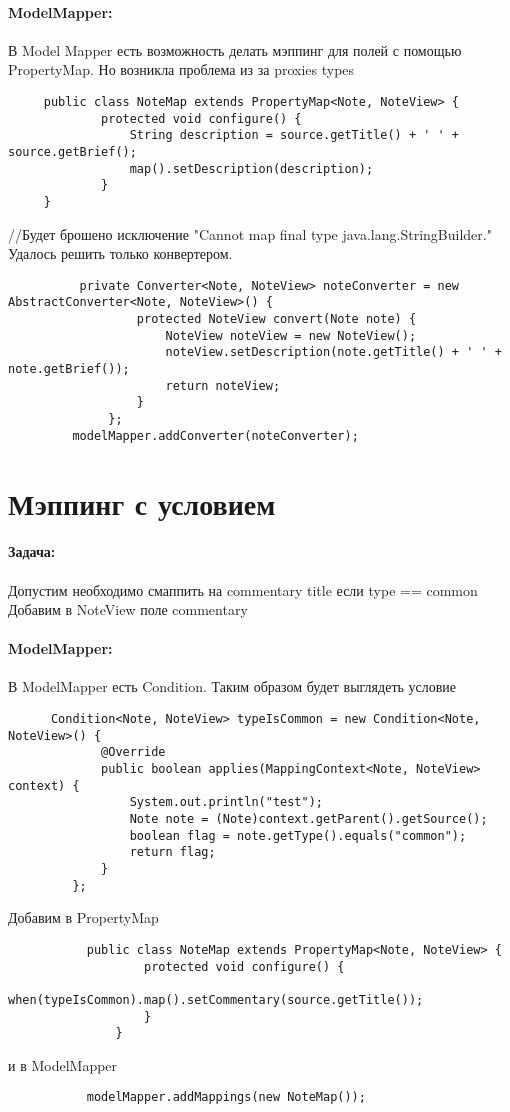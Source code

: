 \documentclass{article}
\begin{document}
    
     \paragraph{ModelMapper:}
     В Model Mapper есть возможность делать мэппинг для полей с помощью  PropertyMap.
     Но возникла проблема из за proxies types
     \begin{lstlisting} 
     public class NoteMap extends PropertyMap<Note, NoteView> {
             protected void configure() {
                 String description = source.getTitle() + ' ' + source.getBrief();
                 map().setDescription(description);
             }
     }
     \end{lstlisting}
     //Будет брошено исключение 
     "Cannot map final type java.lang.StringBuilder."
      Удалось решить только конвертером.
      \begin{lstlisting} 
          private Converter<Note, NoteView> noteConverter = new AbstractConverter<Note, NoteView>() {
                  protected NoteView convert(Note note) {
                      NoteView noteView = new NoteView();
                      noteView.setDescription(note.getTitle() + ' ' + note.getBrief());
                      return noteView;
                  }
              };
         modelMapper.addConverter(noteConverter);
     \end{lstlisting}
\section{Мэппинг с условием} 
    
    \paragraph{Задача:}
Допустим необходимо смаппить на commentary title если type == common 
Добавим в NoteView поле commentary

\paragraph{ModelMapper:}
В ModelMapper есть Condition.
Таким образом будет выглядеть условие
\begin{lstlisting} 
      Condition<Note, NoteView> typeIsCommon = new Condition<Note, NoteView>() {
             @Override
             public boolean applies(MappingContext<Note, NoteView> context) {
                 System.out.println("test");
                 Note note = (Note)context.getParent().getSource();
                 boolean flag = note.getType().equals("common");
                 return flag;
             }
         };
\end{lstlisting}
Добавим в PropertyMap     
     \begin{lstlisting} 
           public class NoteMap extends PropertyMap<Note, NoteView> {
                   protected void configure() {
                       when(typeIsCommon).map().setCommentary(source.getTitle());
                   }
               }
     \end{lstlisting}
и в ModelMapper 
\begin{lstlisting} 
           modelMapper.addMappings(new NoteMap());
     \end{lstlisting}
     
\end{document}
